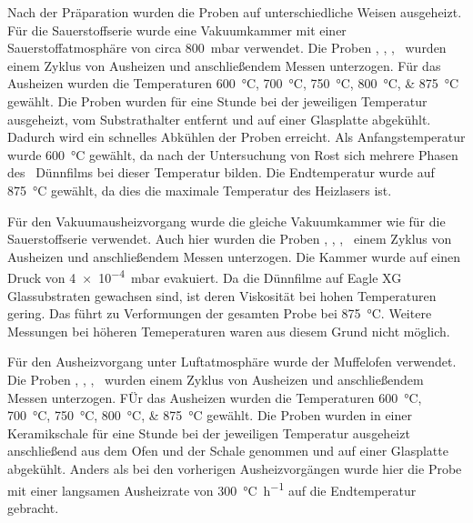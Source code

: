 Nach der Präparation wurden die Proben auf unterschiedliche Weisen ausgeheizt.
Für die Sauerstoffserie wurde eine Vakuumkammer mit einer Sauerstoffatmosphäre von circa \qty{800}{\milli\bar}
verwendet.
Die Proben \samplethree, \sampleone, \sampletwo, \samplefour\ wurden einem Zyklus von Ausheizen und anschließendem
Messen unterzogen.
Für das Ausheizen wurden die Temperaturen \qtylist{600;700;750;800;875}{\degreeCelsius} gewählt.
Die Proben wurden für eine Stunde bei der jeweiligen Temperatur ausgeheizt, vom Substrathalter entfernt und auf einer
Glasplatte abgekühlt.
Dadurch wird ein schnelles Abkühlen der Proben erreicht.
Als Anfangstemperatur wurde \qty{600}{\degreeCelsius} gewählt, da nach der Untersuchung von Rost
sich mehrere Phasen des \heo\ Dünnfilms bei dieser Temperatur bilden.
Die Endtemperatur wurde auf \qty{875}{\degreeCelsius} gewählt, da dies die maximale Temperatur des Heizlasers ist.

Für den Vakuumausheizvorgang wurde die gleiche Vakuumkammer wie für die Sauerstoffserie verwendet.
Auch hier wurden die Proben \samplethree, \sampleone, \sampletwo, \samplefour\ einem Zyklus von Ausheizen und
anschließendem Messen unterzogen.
Die Kammer wurde auf einen Druck von \qty{4e-4}{\milli\bar} evakuiert.
Da die Dünnfilme auf Eagle XG Glassubstraten gewachsen sind, ist deren Viskosität bei hohen
Temperaturen gering.
Das führt zu Verformungen der gesamten Probe bei \qty{875}{\degreeCelsius}.
Weitere Messungen bei höheren Temeperaturen waren aus diesem Grund nicht möglich.

Für den Ausheizvorgang unter Luftatmosphäre wurde der Muffelofen verwendet.
Die Proben \samplethree, \sampleone, \sampletwo, \samplefour\ wurden einem Zyklus von Ausheizen und anschließendem
Messen unterzogen.
FÜr das Ausheizen wurden die Temperaturen \qtylist{600;700;750;800;875}{\degreeCelsius} gewählt.
Die Proben wurden in einer Keramikschale für eine Stunde bei der jeweiligen Temperatur ausgeheizt anschließend
aus dem Ofen und der Schale genommen und auf einer Glasplatte abgekühlt.
Anders als bei den vorherigen Ausheizvorgängen wurde hier die Probe mit einer langsamen Ausheizrate von
\qty{300}{\degreeCelsius\per\hour} auf die Endtemperatur gebracht.


